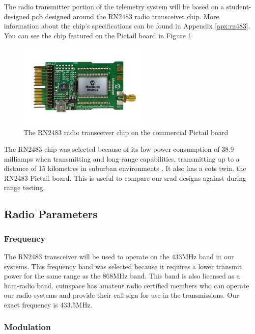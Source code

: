 The radio transmitter portion of the telemetry system will be based on a student-designed \gls{pcb} designed around the
RN2483 radio transceiver chip. More information about the chip's specifications can be found in Appendix
\ref{apx:rn483}. You can see the chip featured on the Pictail board in Figure \ref{fig:pictail}

\begin{figure}[H]
    \centering
    \includegraphics[width=2.5in]{assets/images/pictail.jpg}
    \caption{The RN2483 radio transceiver chip on the commercial Pictail board \cite{pictail-img}}
    \label{fig:pictail}
\end{figure}

The RN2483 chip was selected because of its low power consumption of 38.9 milliamps when transmitting \cite[Table
    2-3]{rn2483-datasheet} and long-range capabilities, transmitting up to a distance of 15 kilometres in suburban
environments \cite[1]{rn2483-datasheet}. It also has a \gls{cots} twin, the RN2483 Pictail board. This is useful to
compare our \gls{srad} designs against during range testing.

\subsection{Radio Parameters}

\subsubsection{Frequency}

The RN2483 transceiver will be used to operate on the 433MHz band in our systems. This frequency band was selected
because it requires a lower transmit power for the same range \cite[Table 2-5]{rn2483-datasheet} as the 868MHz band.
This band is also licensed as a \gls{ham-radio} band. \Gls{cuinspace} has amateur radio certified members who can
operate our radio systems and provide their call-sign for use in the transmissions. Our exact frequency is 433.5MHz.

\subsubsection{Modulation}


